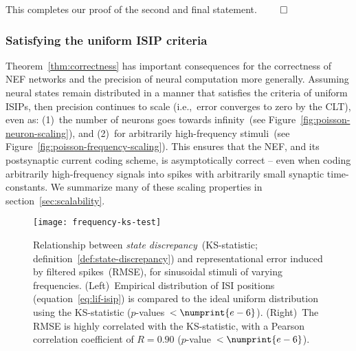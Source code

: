 This completes our proof of the second and final statement. $\hfill \qed$

\subsubsection{Satisfying the uniform ISIP criteria}

Theorem~\ref{thm:correctness} has important consequences for the correctness of NEF networks and the precision of neural computation more generally.
Assuming neural states remain distributed in a manner that satisfies the criteria of uniform ISIPs, then precision continues to scale (i.e.,~error converges to zero by the CLT), even as:
(1)~the number of neurons goes towards infinity~(see Figure~\ref{fig:poisson-neuron-scaling}), and
(2)~for arbitrarily high-frequency stimuli~(see Figure~\ref{fig:poisson-frequency-scaling}).
This ensures that the NEF, and its postsynaptic current coding scheme, is asymptotically correct -- even when coding arbitrarily high-frequency signals into spikes with arbitrarily small synaptic time-constants.
We summarize many of these scaling properties in section~\ref{sec:scalability}.

\begin{figure}[h!]
\centering
\texttt{[image: frequency-ks-test]}
\caption{\label{fig:frequency-ks-test}
  Relationship between \emph{state discrepancy}~(KS-statistic; definition~\ref{def:state-discrepancy}) and representational error induced by filtered spikes~(RMSE), for sinusoidal stimuli of varying frequencies.
  (Left)~Empirical distribution of ISI positions (equation~\ref{eq:lif-isip}) is compared to the ideal uniform distribution using the KS-statistic ($p$-values~$< \numprint{e-6}$).
  (Right)~The RMSE is highly correlated with the KS-statistic, with a Pearson correlation coefficient of $R = 0.90$ ($p$-value~$< \numprint{e-6}$).
}
\end{figure}

